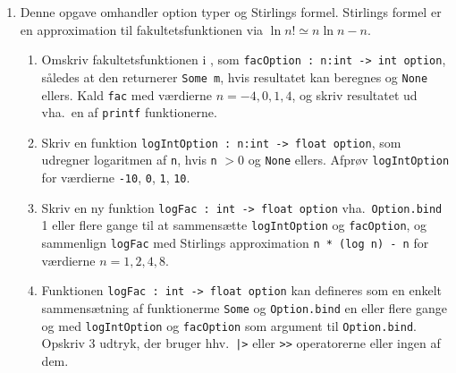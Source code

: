 \documentclass[a4paper,12pt]{article}
\begin{document}
\begin{enumerate}[label=5ø.\arabic*,start=0]
\item Denne opgave omhandler option typer og Stirlings formel. Stirlings formel er en approximation til fakultetsfunktionen via $\ln n! \simeq n \ln n - n$.
  \begin{enumerate}
  \item Omskriv fakultetsfunktionen i , som \lstinline{facOption : n:int -> int option}, således at den returnerer \lstinline{Some m}, hvis resultatet kan beregnes og \lstinline{None} ellers. Kald \lstinline{fac} med værdierne $n=-4,0,1,4$, og skriv resultatet ud vha.\ en af \lstinline{printf} funktionerne.
  \item \label{logIntOption} Skriv en funktion \lstinline{logIntOption : n:int -> float option}, som udregner logaritmen af \lstinline{n}, hvis \lstinline{n} $>0$ og \lstinline{None} ellers. Afprøv \lstinline{logIntOption} for værdierne \lstinline{-10}, \lstinline{0}, \lstinline{1}, \lstinline{10}.
  \item Skriv en ny funktion \lstinline{logFac : int -> float option} vha.\ \lstinline{Option.bind} 1 eller flere gange til at sammensætte \lstinline{logIntOption} og \lstinline{facOption}, og sammenlign \lstinline{logFac} med Stirlings approximation \lstinline{n * (log n) - n} for værdierne $n= 1, 2, 4, 8$.
  \item Funktionen \lstinline{logFac : int -> float option} kan defineres som en enkelt sammensætning af funktionerme \lstinline{Some} og \lstinline{Option.bind} en eller flere gange og med \lstinline{logIntOption} og \lstinline{facOption} som argument til \lstinline{Option.bind}. Opskriv 3 udtryk, der bruger hhv.\ \lstinline{|>} eller \lstinline{>>} operatorerne eller ingen af dem.
  \end{enumerate}
\end{enumerate}
\end{document}
